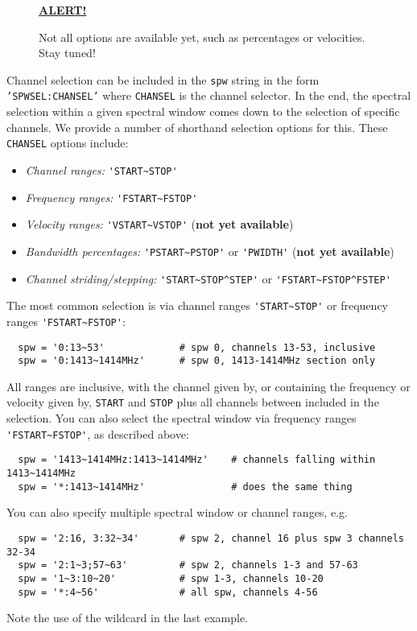 \begin{wrapfigure}{r}{2.5in}
  \begin{boxedminipage}{2.5in}
     \centerline{\underline{\bf ALERT!}}
     Not all options are available yet, such as
     percentages or velocities. Stay tuned!
  \end{boxedminipage}
\end{wrapfigure}
Channel selection can be included in the {\tt spw} string in the form
{\tt 'SPWSEL:CHANSEL'} where {\tt CHANSEL} is the channel selector.
In the end, the spectral selection within a given spectral window
comes down to the selection of specific channels.  We provide a number
of shorthand selection options for this.  These {\tt CHANSEL} 
options include:
\begin{itemize}
\item {\it Channel ranges:} {\verb!'START~STOP'!}
\item {\it Frequency ranges:} {\verb!'FSTART~FSTOP'!}
\item {\it Velocity ranges:} {\verb!'VSTART~VSTOP'!} ({\bf not yet available})
\item {\it Bandwidth percentages:} {\verb!'PSTART~PSTOP'!} or {\verb!'PWIDTH'!}
           ({\bf not yet available})
\item {\it Channel striding/stepping:} {\verb!'START~STOP^STEP'!} or 
           {\verb!'FSTART~FSTOP^FSTEP'!}
\end{itemize}

The most common selection is via channel ranges
{\verb!'START~STOP'!} or frequency ranges {\verb!'FSTART~FSTOP'!}:
\small
\begin{verbatim}
  spw = '0:13~53'             # spw 0, channels 13-53, inclusive
  spw = '0:1413~1414MHz'      # spw 0, 1413-1414MHz section only
\end{verbatim}
\normalsize
All ranges are inclusive, with the channel given by, or containing
the frequency or velocity given by, {\tt START} and {\tt STOP} plus
all channels between included in the selection.  You can also select
the spectral window via frequency ranges {\verb!'FSTART~FSTOP'!}, 
as described above:
\small
\begin{verbatim}
  spw = '1413~1414MHz:1413~1414MHz'    # channels falling within 1413~1414MHz
  spw = '*:1413~1414MHz'               # does the same thing
\end{verbatim}
\normalsize

You can also specify multiple spectral window or channel ranges, e.g.
\small
\begin{verbatim}
  spw = '2:16, 3:32~34'       # spw 2, channel 16 plus spw 3 channels 32-34
  spw = '2:1~3;57~63'         # spw 2, channels 1-3 and 57-63
  spw = '1~3:10~20'           # spw 1-3, channels 10-20
  spw = '*:4~56'              # all spw, channels 4-56
\end{verbatim}
\normalsize
Note the use of the wildcard in the last example.

